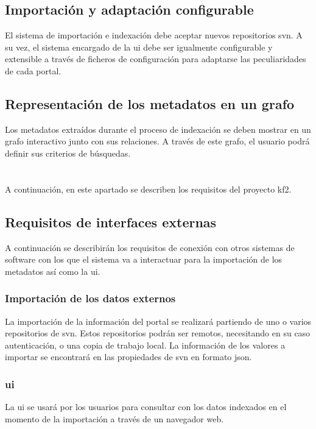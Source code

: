 \subsection{Importación y adaptación configurable}
El sistema de importación e indexación debe aceptar nuevos repositorios \gls{svn}. A su vez, el sistema encargado de la \gls{ui} debe ser igualmente configurable y extensible a través de ficheros de configuración para adaptarse las peculiaridades de cada portal.

\subsection{Representación de los \glspl{metadato} en un grafo}
Los \glspl{metadato} extraídos durante el proceso de indexación se deben mostrar en un grafo interactivo junto con sus relaciones. A través de este grafo, el usuario podrá definir sus criterios de búsquedas.


\section{}
A continuación, en este apartado se describen los requisitos del proyecto \gls{kf2}.

\subsection{Requisitos de interfaces externas}

A continuación se describirán los requisitos de conexión con otros sistemas de software con los que el sistema va a interactuar para la importación de los \glspl{metadato} así como la \gls{ui}.

\subsubsection{Importación de los datos externos}
La importación de la información del portal se realizará partiendo de uno o varios repositorios de \gls{svn}. Estos repositorios podrán ser remotos, necesitando en su caso autenticación, o una copia de trabajo local. La información de los valores a importar se encontrará en las propiedades de \gls{svn} en formato \gls{json}.


\subsubsection{\Gls{ui}}
La \gls{ui} se usará por los usuarios para consultar con los datos indexados en el momento de la importación a través de un navegador web.\\

